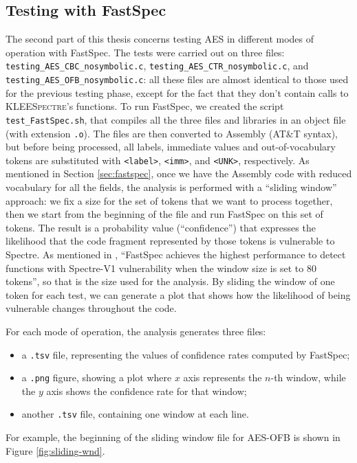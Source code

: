 \documentclass[target=mst,aauheader=aics]{thud}
\theoremstyle{definition}
\begin{document}
\subsection{Testing with FastSpec}
The second part of this thesis concerns testing AES in different modes of operation with FastSpec. The tests were carried out on three files: \texttt{testing\_AES\_CBC\_nosymbolic.c}, \texttt{testing\_AES\_CTR\_nosymbolic.c}, and \texttt{testing\_AES\_OFB\_nosymbolic.c}: all these files are almost identical to those used for the previous testing phase, except for the fact that they don't contain calls to \textsc{KLEESpectre}'s functions. To run FastSpec, we created the script \texttt{test\_FastSpec.sh}, that compiles all the three files and libraries in an object file (with extension \texttt{.o}). The files are then converted to Assembly (AT\&T syntax), but before being processed, all labels, immediate values and out-of-vocabulary tokens are substituted with \texttt{<label>}, \texttt{<imm>}, and \texttt{<UNK>}, respectively. As mentioned in Section \ref{sec:fastspec}, once we have the Assembly code with reduced vocabulary for all the fields, the analysis is performed with a ``sliding window'' approach: we fix a size for the set of tokens that we want to process together, then we start from the beginning of the file and run FastSpec on this set of tokens. The result is a probability value (``confidence'') that expresses the likelihood that the code fragment represented by those tokens is vulnerable to Spectre. As mentioned in \cite{Tol2021}, ``FastSpec achieves the highest performance to detect functions with Spectre-V1 vulnerability when the window size is set to 80 tokens'', so that is the size used for the analysis. By sliding the window of one token for each test, we can generate a plot that shows how the likelihood of being vulnerable changes throughout the code. 

For each mode of operation, the analysis generates three files:
\begin{itemize}
	\item a \texttt{.tsv} file, representing the values of confidence rates computed by FastSpec;
	\item a \texttt{.png} figure, showing a plot where $x$ axis represents the $n$-th window, while the $y$ axis shows the confidence rate for that window;
	\item another \texttt{.tsv} file, containing one window at each line.
\end{itemize}

For example, the beginning of the sliding window file for AES-OFB is shown in Figure \ref{fig:sliding-wnd}.
\end{document}
